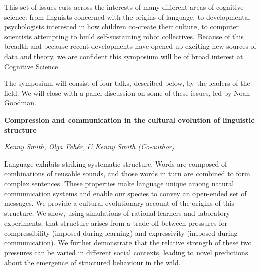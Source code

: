 \documentclass[10pt,letterpaper]{article}
\begin{document}
This set of issues cuts across the interests of many different areas of cognitive science: from linguists concerned with the origins of language, to developmental psychologists interested in how children co-create their culture, to computer scientists attempting to build self-sustaining robot collectives. 
Because of this breadth and because recent developments have opened up exciting new sources of data and theory, we are confident this symposium will be of broad interest at Cognitive Science.

The symposium will consist of four talks, described below, by the leaders of the field.
We will close with a panel discussion on some of these issues, led by Noah Goodman.


\begin{center}\textbf{Compression and communication in the cultural evolution of linguistic structure}\end{center}
\begin{center}\emph{Kenny Smith, Olga Feh\'er, \& Kenny Smith (Co-author)}\end{center}

Language exhibits striking systematic structure. Words are composed of combinations of reusable sounds, and those words in turn are combined to form complex sentences. These properties make language unique among natural communication systems and enable our species to convey an open-ended set of messages.  We provide a cultural evolutionary account of the origins of this structure. We show, using simulations of rational learners and laboratory experiments, that structure arises from a trade-off between pressures for compressibility (imposed during learning) and expressivity (imposed during communication). We further demonstrate that the relative strength of these two pressures can be varied in different social contexts, leading to novel predictions about the emergence of structured behaviour in the wild.
\end{document}
